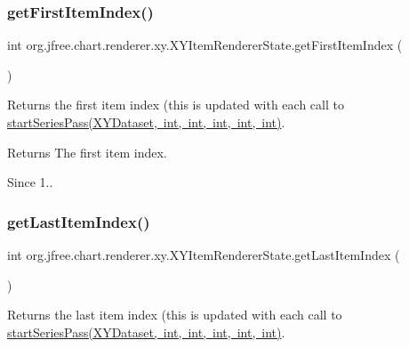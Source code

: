 \subsubsection{\texorpdfstring{get\+First\+Item\+Index()}{getFirstItemIndex()}}
{\footnotesize\ttfamily int org.\+jfree.\+chart.\+renderer.\+xy.\+X\+Y\+Item\+Renderer\+State.\+get\+First\+Item\+Index (\begin{DoxyParamCaption}{ }\end{DoxyParamCaption})}

Returns the first item index (this is updated with each call to \mbox{\hyperlink{classorg_1_1jfree_1_1chart_1_1renderer_1_1xy_1_1_x_y_item_renderer_state_af81402a6d5fd64c706dec147748bb8d7}{start\+Series\+Pass(\+X\+Y\+Dataset, int, int, int, int, int)}}.

\begin{DoxyReturn}{Returns}
The first item index.
\end{DoxyReturn}
\begin{DoxySince}{Since}
1.. 
\end{DoxySince}
\mbox{\label{classorg_1_1jfree_1_1chart_1_1renderer_1_1xy_1_1_x_y_item_renderer_state_a7360127dfaccbbd9b1489b75a35e9e16}} 
\subsubsection{\texorpdfstring{get\+Last\+Item\+Index()}{getLastItemIndex()}}
{\footnotesize\ttfamily int org.\+jfree.\+chart.\+renderer.\+xy.\+X\+Y\+Item\+Renderer\+State.\+get\+Last\+Item\+Index (\begin{DoxyParamCaption}{ }\end{DoxyParamCaption})}

Returns the last item index (this is updated with each call to \mbox{\hyperlink{classorg_1_1jfree_1_1chart_1_1renderer_1_1xy_1_1_x_y_item_renderer_state_af81402a6d5fd64c706dec147748bb8d7}{start\+Series\+Pass(\+X\+Y\+Dataset, int, int, int, int, int)}}.


